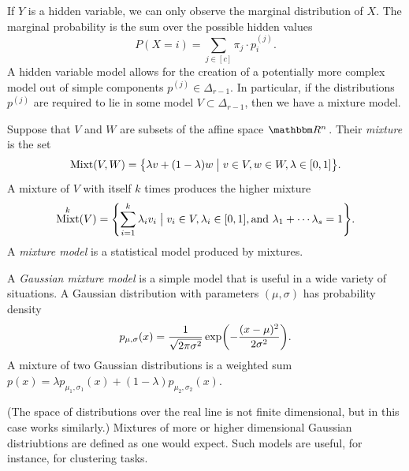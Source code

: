 \documentclass[11pt,titlepage]{article}
\newcommand*{\vbar}{\;\big\vert\;}
\DeclareMathOperator{\Mixt}{Mixt}
\begin{document}
    If $Y$ is a hidden variable, we can only observe the marginal distribution
    of $X$.  The marginal probability is the sum over the possible hidden values
    \[
        P(X = i) = \sum_{j \in [c]} \pi_j \cdot p_i^{(j)}.
    \]
    A hidden variable model allows for the creation of a potentially more
    complex model out of simple components $p^{(j)} \in \Delta_{r-1}$.
    In particular, if the distributions $p^{(j)}$ are required to lie in some
    model $V \subset \Delta_{r-1}$, then we have a mixture model.
    \begin{definition}
    Suppose that $V$ and $W$ are subsets of the affine space $\R^n$.  Their
    \emph{mixture} is the set
    \[
        \Mixt(V, W) = \cdil[\big]{
        \lambda v + (1 - \lambda)w \vbar
        v \in V, w \in W, \lambda \in [0,1]
        }.
    \]
    A mixture of $V$ with itself $k$ times produces the higher mixture
    \[
        \Mixt^k(V) = \cdil*{
        \sum_{i=1}^k \lambda_i v_i \vbar v_i \in V, \lambda_i \in [0,1],
        \text{and }\lambda_1 + \cdots \lambda_s = 1
        }.
    \]
    A \emph{mixture model} is a statistical model produced by mixtures.
    \end{definition}

    \begin{example}
    A \emph{Gaussian mixture model} is a simple model that is useful in a wide
    variety of situations.  A Gaussian distribution with parameters $(\mu,
    \sigma)$ has probability density
    \[
        p_{\mu, \sigma}(x) = \frac{1}{\sqrt{2\pi\sigma^2}} 
        \exp\pdil*{-\frac{(x - \mu)^2}{2\sigma^2}}.
    \]
    A mixture of two Gaussian distributions is a weighted sum $p(x) = \lambda
    p_{\mu_1, \sigma_1}(x) + (1 - \lambda)p_{\mu_2, \sigma_2}(x)$.  
    \begin{center}
    \end{center}
    (The space of distributions over the real line is not finite dimensional,
    but in this case works similarly.) Mixtures of more or higher dimensional
    Gaussian distriubtions are defined as one would expect.  Such models are
    useful, for instance, for clustering tasks.
    \end{example}
\end{document}

